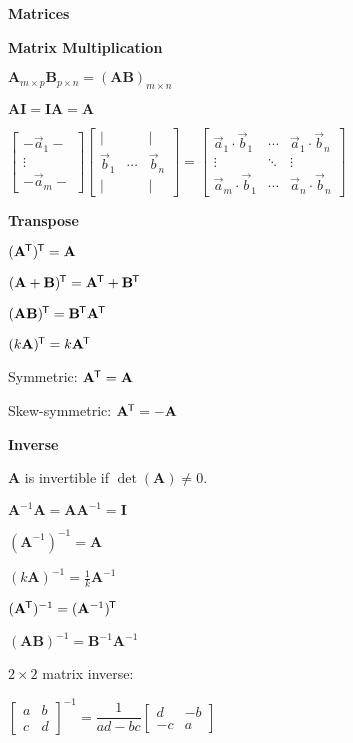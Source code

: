 \documentclass[10pt]{article}
\newcommand{\matr}[1]{\mathbf{#1}}
\newcommand{\tran}{^{\mkern-1.5mu\mathsf{T}}}
\newcommand{\inv}{^{-1}}
\newcommand\sectionheading[1]{\begin{center}\large{\textbf{#1}}\end{center}\normalsize}
\newcommand\heading[1]{\medskip\textbf{#1}\medskip}
\begin{document}
\begin{multicols*}{3}
\sectionheading{Matrices}

\heading{Matrix Multiplication}

$\matr{A}_{m\times p}\matr{B}_{p\times n}=(\matr{A}\matr{B})_{m\times n}$

$\matr{A}\matr{I}=\matr{I}\matr{A}=\matr{A}$

$\begin{bmatrix}
    -\vec a_1- \\
    \vdots \\
    -\vec a_m- 
\end{bmatrix} \begin{bmatrix}
    \vert & & \vert \\
    \vec b_1 & \cdots & \vec b_n \\
    \vert & & \vert 
\end{bmatrix}=\begin{bmatrix}
    \vec a_1 \cdot \vec b_1 & \cdots & \vec a_1 \cdot \vec b_n \\
    \vdots & \ddots & \vdots  \\
    \vec a_m \cdot \vec b_1 & \cdots & \vec a_n \cdot \vec b_n
\end{bmatrix}$

\heading{Transpose}

$(\matr{A}\tran)\tran=\matr{A}$

$(\matr{A}+\matr{B})\tran=\matr{A}\tran+\matr{B}\tran$

$(\matr{A}\matr{B})\tran=\matr{B}\tran\matr{A}\tran$

$(k\matr{A})\tran=k\matr{A}\tran$

Symmetric: $\matr{A}\tran=\matr{A}$

Skew-symmetric: $\matr{A}\tran=-\matr{A}$

\heading{Inverse}

$\matr{A}$ is invertible if $\det(\matr{A})\ne0$.

$\matr{A}\inv\matr{A}=\matr{A}\matr{A}\inv=\matr{I}$

$(\matr{A}\inv)\inv=\matr{A}$

$(k\matr{A})\inv=\frac 1k\matr{A}\inv$

$(\matr{A}\tran)\inv=(\matr{A}\inv)\tran$

$(\matr{A}\matr{B})\inv=\matr{B}\inv\matr{A}\inv$

$2\times2$ matrix inverse:

$\begin{bmatrix}
    a & b \\
    c & d
\end{bmatrix}\inv = \dfrac{1}{ad-bc}\begin{bmatrix}
    d & -b \\
    -c & a
\end{bmatrix}$


\end{multicols*}
\end{document}

